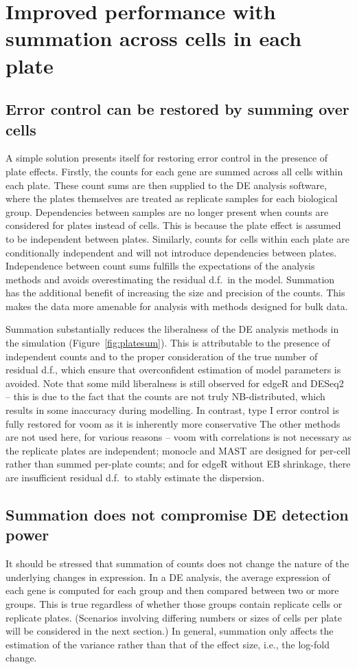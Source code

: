 \documentclass[oupdraft]{bio}
\begin{document}
\section{Improved performance with summation across cells in each plate}

\subsection{Error control can be restored by summing over cells}
A simple solution presents itself for restoring error control in the presence of plate effects.
Firstly, the counts for each gene are summed across all cells within each plate.
These count sums are then supplied to the DE analysis software, where the plates themselves are treated as replicate samples for each biological group.
Dependencies between samples are no longer present when counts are considered for plates instead of cells.
This is because the plate effect is assumed to be independent between plates. 
Similarly, counts for cells within each plate are conditionally independent and will not introduce dependencies between plates.
Independence between count sums fulfills the expectations of the analysis methods and avoids overestimating the residual d.f.\ in the model.
Summation has the additional benefit of increasing the size and precision of the counts.
This makes the data more amenable for analysis with methods designed for bulk data.

Summation substantially reduces the liberalness of the DE analysis methods in the simulation (Figure~\ref{fig:platesum}).
This is attributable to the presence of independent counts and to the proper consideration of the true number of residual d.f., 
    which ensure that overconfident estimation of model parameters is avoided.
Note that some mild liberalness is still observed for edgeR and DESeq2 
    -- this is due to the fact that the counts are not truly NB-distributed, which results in some inaccuracy during modelling.
In contrast, type I error control is fully restored for voom as it is inherently more conservative \citep{law2014voom}
The other methods are not used here, for various reasons -- voom with correlations is not necessary as the replicate plates are independent;
    monocle and MAST are designed for per-cell rather than summed per-plate counts;
    and for edgeR without EB shrinkage, there are insufficient residual d.f.\ to stably estimate the dispersion.

\subsection{Summation does not compromise DE detection power}
It should be stressed that summation of counts does not change the nature of the underlying changes in expression.
In a DE analysis, the average expression of each gene is computed for each group and then compared between two or more groups.
This is true regardless of whether those groups contain replicate cells or replicate plates. 
(Scenarios involving differing numbers or sizes of cells per plate will be considered in the next section.)
In general, summation only affects the estimation of the variance rather than that of the effect size, i.e., the log-fold change.
\end{document}
